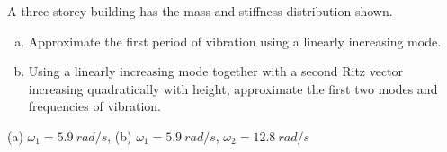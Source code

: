 
\begin{Exercise}[label={three_storey_helicopter}]
A three storey building has the mass and stiffness distribution shown.

\begin{enumerate}[(a)]
    \item Approximate the first period of vibration using a linearly increasing mode.
    \item Using a linearly increasing mode together with a second Ritz vector increasing quadratically with height, approximate the first two modes and frequencies of vibration.
\end{enumerate}    

\begin{center}
\end{center}
\shortAnswer (a) $\omega_1 = \SI{5.9}{rad/s}$, (b) $\omega_1 = \SI{5.9}{rad/s}$, $\omega_2 = \SI{12.8}{rad/s}$
\end{Exercise}



